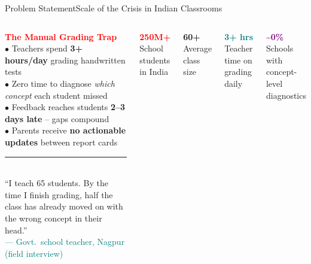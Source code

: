\documentclass[aspectratio=169,10pt]{beamer}
\newcommand{\statrow}[3]{%
  \begin{center}
    \colorbox{card}{\parbox{0.88\linewidth}{\centering
      \textcolor{#1}{\Large\textbf{#2}}\\[1pt]
      \textcolor{txtsec}{\scriptsize #3}
    }}
  \end{center}
  \vspace{3pt}
}
\begin{document}
\begin{frame}[t,shrink=5]{Problem Statement}{Scale of the Crisis in Indian Classrooms}
\begin{columns}[T]

\vspace{4pt}
\colorbox{card}{\parbox{0.92\linewidth}{%
  \vspace{4pt}
  \textcolor{red}{\small\textbf{The Manual Grading Trap}}\\[6pt]
  \textcolor{txtsec}{\scriptsize$\bullet$} \textcolor{txt}{\small Teachers spend \textbf{3+ hours/day} grading handwritten tests}\\[4pt]
  \textcolor{txtsec}{\scriptsize$\bullet$} \textcolor{txt}{\small Zero time to diagnose \textit{which concept} each student missed}\\[4pt]
  \textcolor{txtsec}{\scriptsize$\bullet$} \textcolor{txt}{\small Feedback reaches students \textbf{2--3 days late} -- gaps compound}\\[4pt]
  \textcolor{txtsec}{\scriptsize$\bullet$} \textcolor{txt}{\small Parents receive \textbf{no actionable updates} between report cards}\\[6pt]
  \textcolor{txtsec}{\rule{0.92\linewidth}{0.3pt}}\\[4pt]
  \textcolor{txtsec}{\scriptsize``I teach 65 students. By the time I finish grading, half the class has already moved on with the wrong concept in their head.''}\\
  \textcolor{teal}{\scriptsize --- Govt.\ school teacher, Nagpur (field interview)}\\[4pt]
}}

\vspace{4pt}
\statrow{red}{250M+}{School students in India}
\statrow{orng}{60+}{Average class size}
\statrow{teal}{3+ hrs}{Teacher time on grading daily}
\statrow{purple}{\textasciitilde0\%}{Schools with concept-level diagnostics}

\end{columns}
\end{frame}
\end{document}
